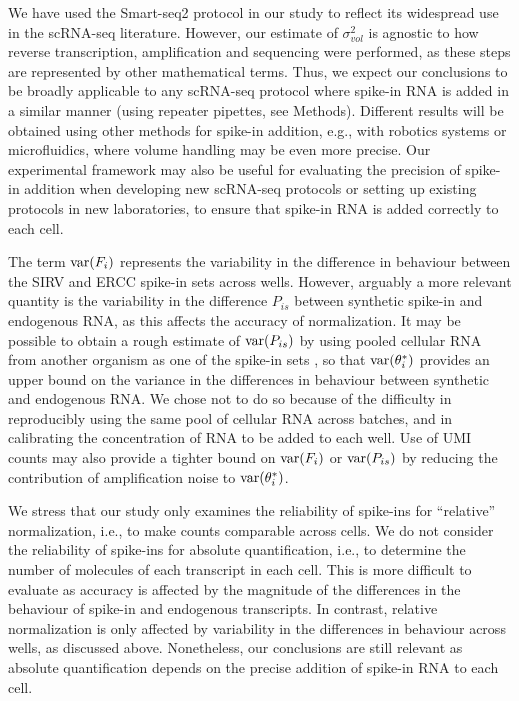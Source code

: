 \documentclass{article}
\begin{document}
We have used the Smart-seq2 protocol in our study to reflect its widespread use in the scRNA-seq literature.
However, our estimate of $\sigma^2_{vol}$ is agnostic to how reverse transcription, amplification and sequencing were performed, as these steps are represented by other mathematical terms.
Thus, we expect our conclusions to be broadly applicable to any scRNA-seq protocol where spike-in RNA is added in a similar manner (using repeater pipettes, see Methods).
Different results will be obtained using other methods for spike-in addition, e.g., with robotics systems or microfluidics, where volume handling may be even more precise.
Our experimental framework may also be useful for evaluating the precision of spike-in addition when developing new scRNA-seq protocols or setting up existing protocols in new laboratories, to ensure that spike-in RNA is added correctly to each cell.

The term $\mbox{var}(F_i)$ represents the variability in the difference in behaviour between the SIRV and ERCC spike-in sets across wells.
However, arguably a more relevant quantity is the variability in the difference $P_{is}$ between synthetic spike-in and endogenous RNA, as this affects the accuracy of normalization.
It may be possible to obtain a rough estimate of $\mbox{var}(P_{is})$ by using pooled cellular RNA from another organism as one of the spike-in sets \cite{brennecke2013accounting}, so that $\mbox{var}(\theta^*_i)$ provides an upper bound on the variance in the differences in behaviour between synthetic and endogenous RNA.
We chose not to do so because of the difficulty in reproducibly using the same pool of cellular RNA across batches, and in calibrating the concentration of RNA to be added to each well.
Use of UMI counts may also provide a tighter bound on $\mbox{var}(F_i)$ or $\mbox{var}(P_{is})$ by reducing the contribution of amplification noise to $\mbox{var}(\theta^*_i)$.

We stress that our study only examines the reliability of spike-ins for ``relative'' normalization, i.e., to make counts comparable across cells.
We do not consider the reliability of spike-ins for absolute quantification, i.e., to determine the number of molecules of each transcript in each cell.
This is more difficult to evaluate as accuracy is affected by the magnitude of the differences in the behaviour of spike-in and endogenous transcripts.
In contrast, relative normalization is only affected by variability in the differences in behaviour across wells, as discussed above.
Nonetheless, our conclusions are still relevant as absolute quantification depends on the precise addition of spike-in RNA to each cell.
\end{document}
